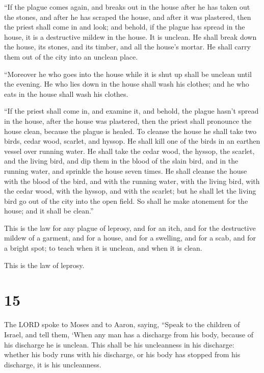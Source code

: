  ``If the plague comes again, and breaks out in the house
after he has taken out the stones, and after he has scraped the house,
and after it was plastered,  then the priest shall come in
and look; and behold, if the plague has spread in the house, it is a
destructive mildew in the house. It is unclean.  He shall
break down the house, its stones, and its timber, and all the house's
mortar. He shall carry them out of the city into an unclean place.

 ``Moreover he who goes into the house while it is shut up
shall be unclean until the evening.  He who lies down in
the house shall wash his clothes; and he who eats in the house shall
wash his clothes.

 ``If the priest shall come in, and examine it, and behold,
the plague hasn't spread in the house, after the house was plastered,
then the priest shall pronounce the house clean, because the plague is
healed.  To cleanse the house he shall take two birds,
cedar wood, scarlet, and hyssop.  He shall kill one of the
birds in an earthen vessel over running water.  He shall
take the cedar wood, the hyssop, the scarlet, and the living bird, and
dip them in the blood of the slain bird, and in the running water, and
sprinkle the house seven times.  He shall cleanse the house
with the blood of the bird, and with the running water, with the living
bird, with the cedar wood, with the hyssop, and with the scarlet;
 but he shall let the living bird go out of the city into
the open field. So shall he make atonement for the house; and it shall
be clean.''

 This is the law for any plague of leprosy, and for an
itch,  and for the destructive mildew of a garment, and for
a house,  and for a swelling, and for a scab, and for a
bright spot;  to teach when it is unclean, and when it is
clean.

This is the law of leprosy.

\hypertarget{section-14}{%
\section{15}\label{section-14}}

 The LORD spoke to Moses and to Aaron, saying, 
``Speak to the children of Israel, and tell them, `When any man has a
discharge from his body, because of his discharge he is unclean.
 This shall be his uncleanness in his discharge: whether his
body runs with his discharge, or his body has stopped from his
discharge, it is his uncleanness.

